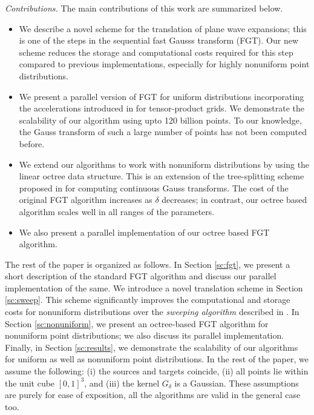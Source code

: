 {\em Contributions.} The main contributions of this work are summarized below.
\begin{itemize} 
%
\item We describe a novel scheme for the translation of plane wave expansions; this is one of the steps in the
 sequential fast Gausss transform (FGT). Our new scheme reduces the storage and computational costs required for this step compared to previous implementations, especially for highly nonuniform point distributions.
%
\item We present a parallel version of FGT for uniform distributions incorporating the accelerations introduced in \cite{fggt} for tensor-product grids. We demonstrate the scalability of our algorithm using  upto 120 billion points. To our knowledge, the Gauss transform of such a large number of points has not been computed before.
%
\item We extend our algorithms to work with nonuniform distributions by using the linear octree data structure. This is an extension of the tree-splitting scheme proposed in \cite{veerapaneni08} for computing continuous Gauss transforms. The cost of the original FGT algorithm increases as $\delta$ decreases; in contrast, our octree based algorithm scales well in all ranges of the parameters.

\item We also present a parallel implementation of our octree based FGT algorithm.
%
\end{itemize}

The rest of the paper is organized as follows. In Section \ref{sc:fgt}, we present a short description of the
 standard FGT algorithm and discuss our parallel implementation of the same. We introduce a novel translation scheme 
 in Section \ref{sc:sweep}. This scheme significantly improves the computational and storage costs for 
 nonuniform distributions over the {\em sweeping algorithm} described in \cite{greengard98}. In Section \ref{sc:nonuniform}, we present an octree-based FGT algorithm for nonuniform point distributions; we also discuss
 its parallel implementation. Finally, in Section \ref{sc:results}, we demonstrate the scalability of our algorithms 
 for uniform as well as nonuniform point distributions. In the rest of the paper, we assume the following: (i) the 
 sources and targets coincide, (ii) all points lie within the unit cube $[0, 1]^3$, and (iii) the kernel $G_\delta$ is a Gaussian. These
 assumptions are purely for ease of exposition, all the algorithms are valid in the general case too. 
 
